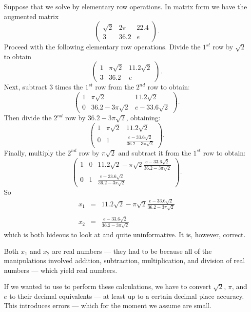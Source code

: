 \documentclass{ximera}
\begin{document}
Suppose that we solve  by elementary row
operations.  In  matrix form we have the augmented matrix
\[
\left(\begin{array}{cc|c} \sqrt{2} & 2\pi & 22.4\\
3 & 36.2 & e\end{array}\right).
\]
Proceed with the following elementary row operations. Divide the
$1^{st}$ row by $\sqrt{2}$ to obtain
\[
\left(\begin{array}{cc|c} 1 & \pi\sqrt{2} & 11.2\sqrt{2}\\
3 & 36.2 & e\end{array}\right).
\]
Next, subtract $3$ times the $1^{st}$ row from the $2^{nd}$ row
to obtain:
\[
\left(\begin{array}{cc|c} 1 & \pi\sqrt{2} & 11.2\sqrt{2}\\
0 & 36.2- 3\pi\sqrt{2} & e- 33.6\sqrt{2}\end{array}\right).
\]
Then divide the $2^{nd}$ row by $36.2-3\pi\sqrt{2}$,
obtaining:
\[
\left(\begin{array}{cc|c} 1 & \pi\sqrt{2} & 11.2\sqrt{2}\\
0 & 1 & \frac{e-33.6\sqrt{2}}{36.2-3\pi\sqrt{2}}\end{array}\right).
\]
Finally, multiply the $2^{nd}$ row by $\pi\sqrt{2}$ and
subtract it from the $1^{st}$ row to obtain:
\[
\left(\begin{array}{cc|c} 1 & 0 &
11.2\sqrt{2}-\pi\sqrt{2}\frac{e-33.6\sqrt{2}}{36.2-3\pi\sqrt{2}} \\
0 & 1 & \frac{e-33.6\sqrt{2}}{36.2-3\pi\sqrt{2}}\end{array}\right).
\]
So
\begin{eqnarray}
x_1 & = &  11.2\sqrt{2}-\pi\sqrt{2}\frac{e-33.6\sqrt{2}}{36.2-3\pi\sqrt{2}}
\nonumber
\\
  &  &   \label{e:irratans} \\
x_2 & = & \frac{e-33.6\sqrt{2}}{36.2-3\pi\sqrt{2}} \nonumber
\end{eqnarray}
which is both hideous to look at and quite uninformative.  It is,
however, correct.

Both $x_1$ and $x_2$ are real numbers --- they had to be because
all of the manipulations involved addition, subtraction,
multiplication, and division of real numbers --- which yield
real numbers.

If we wanted to use \Matlab to perform these calculations, we
have to convert $\sqrt{2}$, $\pi$, and $e$ to their
decimal equivalents --- at least up to a certain decimal place
accuracy. This introduces errors --- which for the moment we
assume are small.
\end{document}
